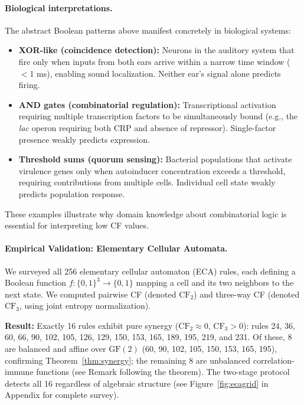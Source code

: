 \documentclass[10pt]{article} %
\theoremstyle{plain}
\theoremstyle{definition}
\begin{document}
\paragraph{Biological interpretations.} The abstract Boolean patterns above manifest concretely in biological systems:
\begin{itemize}
    \item \textbf{XOR-like (coincidence detection):} Neurons in the auditory system that fire only when inputs from both ears arrive within a narrow time window ($<1$ ms), enabling sound localization. Neither ear's signal alone predicts firing.
    \item \textbf{AND gates (combinatorial regulation):} Transcriptional activation requiring multiple transcription factors to be simultaneously bound (e.g., the \emph{lac} operon requiring both CRP and absence of repressor). Single-factor presence weakly predicts expression.
    \item \textbf{Threshold sums (quorum sensing):} Bacterial populations that activate virulence genes only when autoinducer concentration exceeds a threshold, requiring contributions from multiple cells. Individual cell state weakly predicts population response.
\end{itemize}
These examples illustrate why domain knowledge about combinatorial logic is essential for interpreting low CF values.

\paragraph{Empirical Validation: Elementary Cellular Automata.} We surveyed all 256 elementary cellular automaton (ECA) rules, each defining a Boolean function $f: \{0,1\}^3 \to \{0,1\}$ mapping a cell and its two neighbors to the next state. We computed pairwise CF (denoted $\text{CF}_2$) and three-way CF (denoted $\text{CF}_3$, using joint entropy normalization).

\textbf{Result:} Exactly 16 rules exhibit pure synergy ($\text{CF}_2 \approx 0$, $\text{CF}_3 > 0$): rules 24, 36, 60, 66, 90, 102, 105, 126, 129, 150, 153, 165, 189, 195, 219, and 231. Of these, 8 are balanced and affine over $\text{GF}(2)$ (60, 90, 102, 105, 150, 153, 165, 195), confirming Theorem~\ref{thm:synergy}; the remaining 8 are unbalanced correlation-immune functions (see Remark following the theorem). The two-stage protocol detects all 16 regardless of algebraic structure (see Figure~\ref{fig:ecagrid} in Appendix for complete survey).
\end{document}
